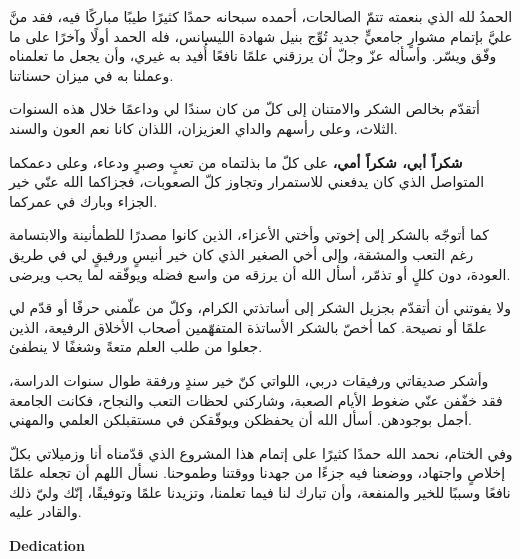 \documentclass[12pt,a4paper]{report}
\begin{document}
{\arabicfont
\begin{RTL}

الحمدُ لله الذي بنعمته تتمّ الصالحات، أحمده سبحانه حمدًا كثيرًا طيبًا مباركًا فيه، فقد منَّ عليَّ بإتمام مشوارٍ جامعيٍّ جديد تُوِّج بنيل شهادة الليسانس، فله الحمد أولًا وآخرًا على ما وفّق ويسّر. وأسأله عزّ وجلّ أن يرزقني علمًا نافعًا أُفيد به غيري، وأن يجعل ما تعلمناه وعملنا به في ميزان حسناتنا.

\vspace{0.4cm}

أتقدّم بخالص الشكر والامتنان إلى كلّ من كان سندًا لي وداعمًا خلال هذه السنوات الثلاث، وعلى رأسهم والداي العزيزان، اللذان كانا نعم العون والسند.

\vspace{0.3cm}

\textbf{شكراً أبي، شكراً أمي،} على كلّ ما بذلتماه من تعبٍ وصبرٍ ودعاء، وعلى دعمكما المتواصل الذي كان يدفعني للاستمرار وتجاوز كلّ الصعوبات، فجزاكما الله عنّي خير الجزاء وبارك في عمركما.

\vspace{0.4cm}

كما أتوجّه بالشكر إلى إخوتي وأختي الأعزاء، الذين كانوا مصدرًا للطمأنينة والابتسامة رغم التعب والمشقة، وإلى أخي الصغير الذي كان خير أنيسٍ ورفيقٍ لي في طريق العودة، دون كللٍ أو تذمّر، أسأل الله أن يرزقه من واسع فضله ويوفّقه لما يحب ويرضى.

\vspace{0.4cm}

ولا يفوتني أن أتقدّم بجزيل الشكر إلى أساتذتي الكرام، وكلّ من علّمني حرفًا أو قدّم لي علمًا أو نصيحة. كما أخصّ بالشكر الأساتذة المتفهّمين أصحاب الأخلاق الرفيعة، الذين جعلوا من طلب العلم متعةً وشغفًا لا ينطفئ.

\vspace{0.4cm}

وأشكر صديقاتي ورفيقات دربي، اللواتي كنّ خير سندٍ ورفقة طوال سنوات الدراسة، فقد خفّفن عنّي ضغوط الأيام الصعبة، وشاركني لحظات التعب والنجاح، فكانت الجامعة أجمل بوجودهن. أسأل الله أن يحفظكن ويوفّقكن في مستقبلكن العلمي والمهني.

\vspace{0.4cm}

وفي الختام، نحمد الله حمدًا كثيرًا على إتمام هذا المشروع الذي قدّمناه أنا وزميلاتي بكلّ إخلاصٍ واجتهاد، ووضعنا فيه جزءًا من جهدنا ووقتنا وطموحنا. نسأل اللهم أن تجعله علمًا نافعًا وسببًا للخير والمنفعة، وأن تبارك لنا فيما تعلمنا، وتزيدنا علمًا وتوفيقًا، إنّك وليّ ذلك والقادر عليه.

\end{RTL}
}
\newpage
\thispagestyle{fancy}
\begin{center}
    {\Large \textbf{Dedication}}
\end{center}
\end{document}
